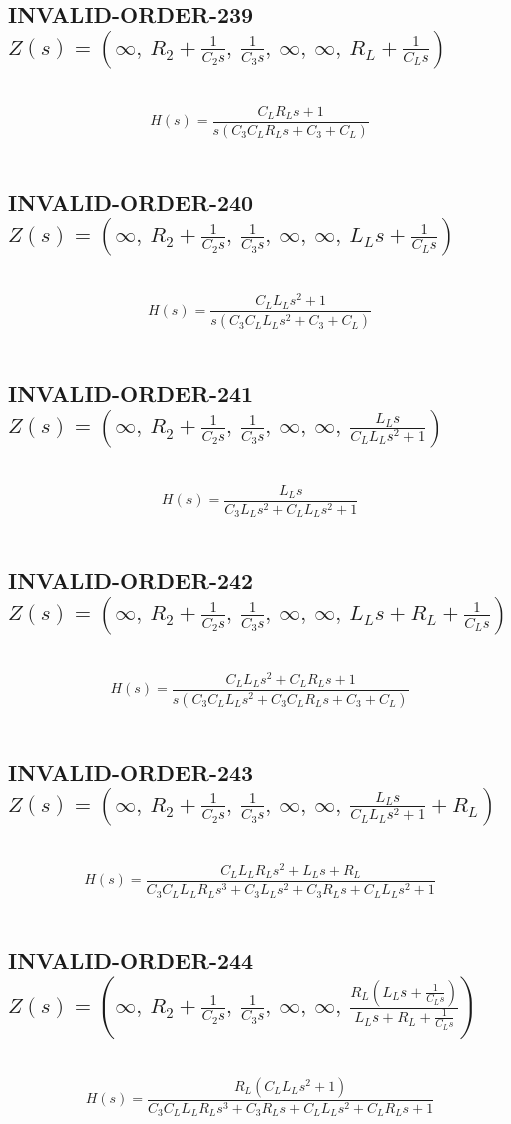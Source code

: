\documentclass{article}
\begin{document}
\subsection{INVALID-ORDER-239 $Z(s) = \left( \infty, \  R_{2} + \frac{1}{C_{2} s}, \  \frac{1}{C_{3} s}, \  \infty, \  \infty, \  R_{L} + \frac{1}{C_{L} s}\right)$ } \ 
\textbf{\[H(s) = \frac{C_{L} R_{L} s + 1}{s \left(C_{3} C_{L} R_{L} s + C_{3} + C_{L}\right)}\] } \ 
\subsection{INVALID-ORDER-240 $Z(s) = \left( \infty, \  R_{2} + \frac{1}{C_{2} s}, \  \frac{1}{C_{3} s}, \  \infty, \  \infty, \  L_{L} s + \frac{1}{C_{L} s}\right)$ } \ 
\textbf{\[H(s) = \frac{C_{L} L_{L} s^{2} + 1}{s \left(C_{3} C_{L} L_{L} s^{2} + C_{3} + C_{L}\right)}\] } \ 
\subsection{INVALID-ORDER-241 $Z(s) = \left( \infty, \  R_{2} + \frac{1}{C_{2} s}, \  \frac{1}{C_{3} s}, \  \infty, \  \infty, \  \frac{L_{L} s}{C_{L} L_{L} s^{2} + 1}\right)$ } \ 
\textbf{\[H(s) = \frac{L_{L} s}{C_{3} L_{L} s^{2} + C_{L} L_{L} s^{2} + 1}\] } \ 
\subsection{INVALID-ORDER-242 $Z(s) = \left( \infty, \  R_{2} + \frac{1}{C_{2} s}, \  \frac{1}{C_{3} s}, \  \infty, \  \infty, \  L_{L} s + R_{L} + \frac{1}{C_{L} s}\right)$ } \ 
\textbf{\[H(s) = \frac{C_{L} L_{L} s^{2} + C_{L} R_{L} s + 1}{s \left(C_{3} C_{L} L_{L} s^{2} + C_{3} C_{L} R_{L} s + C_{3} + C_{L}\right)}\] } \ 
\subsection{INVALID-ORDER-243 $Z(s) = \left( \infty, \  R_{2} + \frac{1}{C_{2} s}, \  \frac{1}{C_{3} s}, \  \infty, \  \infty, \  \frac{L_{L} s}{C_{L} L_{L} s^{2} + 1} + R_{L}\right)$ } \ 
\textbf{\[H(s) = \frac{C_{L} L_{L} R_{L} s^{2} + L_{L} s + R_{L}}{C_{3} C_{L} L_{L} R_{L} s^{3} + C_{3} L_{L} s^{2} + C_{3} R_{L} s + C_{L} L_{L} s^{2} + 1}\] } \ 
\subsection{INVALID-ORDER-244 $Z(s) = \left( \infty, \  R_{2} + \frac{1}{C_{2} s}, \  \frac{1}{C_{3} s}, \  \infty, \  \infty, \  \frac{R_{L} \left(L_{L} s + \frac{1}{C_{L} s}\right)}{L_{L} s + R_{L} + \frac{1}{C_{L} s}}\right)$ } \ 
\textbf{\[H(s) = \frac{R_{L} \left(C_{L} L_{L} s^{2} + 1\right)}{C_{3} C_{L} L_{L} R_{L} s^{3} + C_{3} R_{L} s + C_{L} L_{L} s^{2} + C_{L} R_{L} s + 1}\] } \ 
\end{document}
